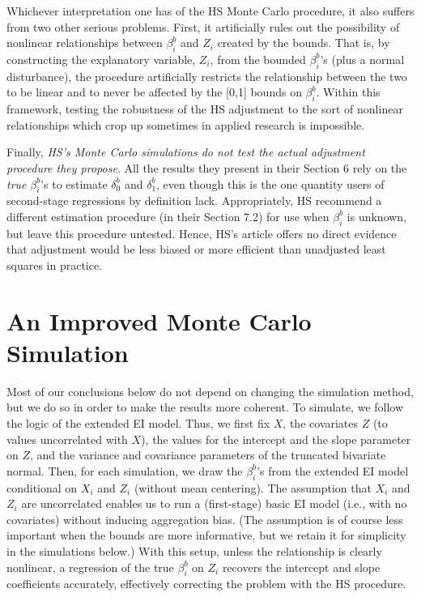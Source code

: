 \documentclass[11pt,titlepage]{article}
\begin{document}
Whichever interpretation one has of the HS Monte Carlo procedure, it
also suffers from two other serious problems.  First, it artificially
rules out the possibility of nonlinear relationships between
$\beta_i^b$ and $Z_i$ created by the bounds.  That is, by constructing
the explanatory variable, $Z_i$, from the bounded $\beta_i^b$'s (plus
a normal disturbance), the procedure artificially restricts the
relationship between the two to be linear and to never be affected by
the [0,1] bounds on $\beta_i^b$.  Within this framework, testing the
robustness of the HS adjustment to the sort of nonlinear relationships
which crop up sometimes in applied research is impossible.

Finally, \emph{HS's Monte Carlo simulations do not test the actual
  adjustment procedure they propose}.  All the results they present in
their Section 6 rely on the \emph{true} $\beta_i^b$'s to estimate
$\delta_0^b$ and $\delta_1^b$, even though this is the one quantity
users of second-stage regressions by definition lack.  Appropriately,
HS recommend a different estimation procedure (in their Section 7.2)
for use when $\beta_i^b$ is unknown, but leave this procedure
untested.  Hence, HS's article offers no direct evidence that
adjustment would be less biased or more efficient than unadjusted
least squares in practice.


\section{An Improved Monte Carlo Simulation} \label{s:alt}

Most of our conclusions below do not depend on changing the simulation
method, but we do so in order to make the results more coherent.  To
simulate, we follow the logic of the extended EI model.  Thus, we
first fix $X$, the covariates $Z$ (to values uncorrelated with $X$),
the values for the intercept and the slope parameter on $Z$, and the
variance and covariance parameters of the truncated bivariate normal.
Then, for each simulation, we draw the $\beta_i^b$'s from the extended
EI model conditional on $X_i$ and $Z_i$ (without mean centering).  The
assumption that $X_i$ and $Z_i$ are uncorrelated enables us to run a
(first-stage) basic EI model (i.e., with no covariates) without
inducing aggregation bias.  (The assumption is of course less
important when the bounds are more informative, but we retain it for
simplicity in the simulations below.)  With this setup, unless the
relationship is clearly nonlinear, a regression of the true
$\beta_i^b$ on $Z_i$ recovers the intercept and slope coefficients
accurately, effectively correcting the problem with the HS
procedure.
\end{document}
